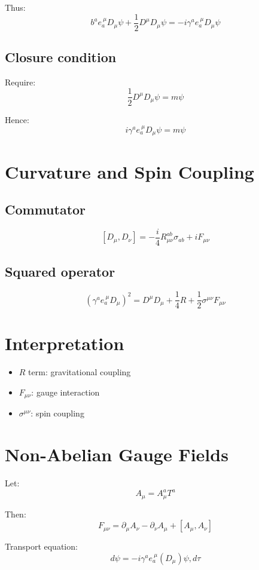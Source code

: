 \documentclass[11pt]{article}
\begin{document}
Thus:
\[
b^a e_a^{\ \mu} D_\mu \psi
+ \frac{1}{2} D^\mu D_\mu \psi
  = -i \gamma^a e_a^{\ \mu} D_\mu \psi
  \]

\subsection{Closure condition}

Require:
\[
\frac{1}{2} D^\mu D_\mu \psi = m \psi
\]

Hence:
\[
i \gamma^a e_a^{\ \mu} D_\mu \psi = m \psi
\]

\section{Curvature and Spin Coupling}

\subsection{Commutator}

\[
[D_\mu, D_\nu]
= -\frac{i}{4} R_{\mu\nu}^{ab} \sigma_{ab}
+ i F_{\mu\nu}
  \]

\subsection{Squared operator}

\[
(\gamma^a e_a^{\ \mu} D_\mu)^2
= D^\mu D_\mu
+ \frac{1}{4} R
+ \frac{1}{2} \sigma^{\mu\nu} F_{\mu\nu}
  \]

\section{Interpretation}

\begin{itemize}
\item $R$ term: gravitational coupling
\item $F_{\mu\nu}$: gauge interaction
\item $\sigma^{\mu\nu}$: spin coupling
\end{itemize}

\section{Non-Abelian Gauge Fields}

Let:
\[
A_\mu = A_\mu^a T^a
\]

Then:
\[
F_{\mu\nu} = \partial_\mu A_\nu - \partial_\nu A_\mu + [A_\mu,A_\nu]
\]

Transport equation:
\[
d\psi = -i \gamma^a e_a^{\ \mu} (D_\mu)\psi, d\tau
\]
\end{document}
